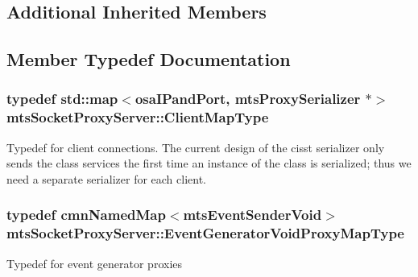 \subsection*{Additional Inherited Members}


\subsection{Member Typedef Documentation}
\hypertarget{classmts_socket_proxy_server_a7119b8c41d2a72f7234f77bdcc1e2fad}{}
\subsubsection[{Client\+Map\+Type}]{\setlength{\rightskip}{0pt plus 5cm}typedef std\+::map$<${\bf osa\+I\+Pand\+Port}, mts\+Proxy\+Serializer $\ast$$>$ {\bf mts\+Socket\+Proxy\+Server\+::\+Client\+Map\+Type}\hspace{0.3cm}{\ttfamily [protected]}}\label{classmts_socket_proxy_server_a7119b8c41d2a72f7234f77bdcc1e2fad}
Typedef for client connections. The current design of the cisst serializer only sends the class services the first time an instance of the class is serialized; thus we need a separate serializer for each client. \hypertarget{classmts_socket_proxy_server_ae784ef6005901f988064e99f28bc4dc4}{}
\subsubsection[{Event\+Generator\+Void\+Proxy\+Map\+Type}]{\setlength{\rightskip}{0pt plus 5cm}typedef {\bf cmn\+Named\+Map}$<$mts\+Event\+Sender\+Void$>$ {\bf mts\+Socket\+Proxy\+Server\+::\+Event\+Generator\+Void\+Proxy\+Map\+Type}\hspace{0.3cm}{\ttfamily [protected]}}\label{classmts_socket_proxy_server_ae784ef6005901f988064e99f28bc4dc4}
Typedef for event generator proxies \hypertarget{classmts_socket_proxy_server_a54071862784d4a4b6b75588e5c03df14}{}
